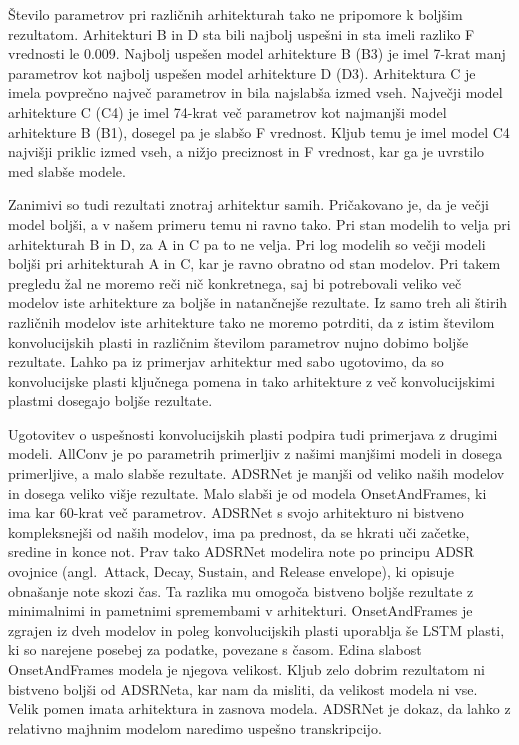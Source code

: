 \documentclass[a4paper, 12pt, openright]{book}
\newcommand{\en}{angl.}
\begin{document}
Število parametrov pri različnih arhitekturah tako ne pripomore k boljšim rezultatom.
Arhitekturi B in D sta bili najbolj uspešni in sta imeli razliko F vrednosti le 0.009. Najbolj uspešen model arhitekture B (B3) je imel 7-krat manj parametrov kot najbolj uspešen model arhitekture D (D3).
Arhitektura C je imela povprečno največ parametrov in bila najslabša izmed vseh.
Največji model arhitekture C (C4) je imel 74-krat več parametrov kot najmanjši model arhitekture B (B1), dosegel pa je slabšo F vrednost.
Kljub temu je imel model C4 najvišji priklic izmed vseh, a nižjo preciznost in F vrednost, kar ga je uvrstilo med slabše modele.

Zanimivi so tudi rezultati znotraj arhitektur samih.
Pričakovano je, da je večji model boljši, a v našem primeru temu ni ravno tako.
Pri stan modelih to velja pri arhitekturah B in D, za A in C pa to ne velja.
Pri log modelih so večji modeli boljši pri arhitekturah A in C, kar je ravno obratno od stan modelov.
Pri takem pregledu žal ne moremo reči nič konkretnega, saj bi potrebovali veliko več modelov iste arhitekture za boljše in natančnejše rezultate.
Iz samo treh ali štirih različnih modelov iste arhitekture tako ne moremo potrditi, da z istim številom konvolucijskih plasti in različnim številom parametrov nujno dobimo boljše rezultate.
Lahko pa iz primerjav arhitektur med sabo ugotovimo, da so konvolucijske plasti ključnega pomena in tako arhitekture z več konvolucijskimi plastmi dosegajo boljše rezultate.

Ugotovitev o uspešnosti konvolucijskih plasti podpira tudi primerjava z drugimi modeli.
AllConv je po parametrih primerljiv z našimi manjšimi modeli in dosega primerljive, a malo slabše rezultate.
ADSRNet je manjši od veliko naših modelov in dosega veliko višje rezultate.
Malo slabši je od modela OnsetAndFrames, ki ima kar 60-krat več parametrov.
ADSRNet s svojo arhitekturo ni bistveno kompleksnejši od naših modelov, ima pa prednost, da se hkrati uči začetke, sredine in konce not.
Prav tako ADSRNet modelira note po principu ADSR ovojnice (\en\ Attack, Decay, Sustain, and Release envelope), ki opisuje obnašanje note skozi čas.
Ta razlika mu omogoča bistveno boljše rezultate z minimalnimi in pametnimi spremembami v arhitekturi.
OnsetAndFrames je zgrajen iz dveh modelov in poleg konvolucijskih plasti uporablja še LSTM plasti, ki so narejene posebej za podatke, povezane s časom.
Edina slabost OnsetAndFrames modela je njegova velikost.
Kljub zelo dobrim rezultatom ni bistveno boljši od ADSRNeta, kar nam da misliti, da velikost modela ni vse.
Velik pomen imata arhitektura in zasnova modela.
ADSRNet je dokaz, da lahko z relativno majhnim modelom naredimo uspešno transkripcijo.
\end{document}
